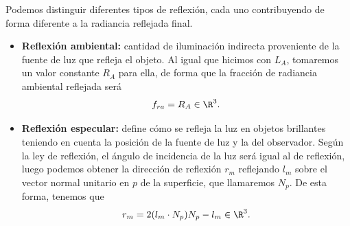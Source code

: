 Podemos distinguir diferentes tipos de reflexión, cada uno contribuyendo de forma diferente a la radiancia reflejada final.

\begin{itemize}
    \item \textbf{Reflexión ambiental:} cantidad de iluminación indirecta proveniente de la fuente de luz que refleja el objeto. Al igual que hicimos con $L_A$, tomaremos un valor constante $R_A$ para ella, de forma que la fracción de radiancia ambiental reflejada será
    \begin{equation*}
        f_{ra} =  R_A \in \R^3.
    \end{equation*}
    \item \textbf{Reflexión especular:} define cómo se refleja la luz en objetos brillantes teniendo en cuenta la posición de la fuente de luz y la del observador. Según la ley de reflexión, el ángulo de incidencia de la luz será igual al de reflexión, luego podemos obtener la dirección de reflexión $r_m$ reflejando $l_m$ sobre el vector normal unitario en $p$ de la superficie, que llamaremos $N_p$. De esta forma, tenemos que
    \begin{equation*}
        r_m = 2(l_m\cdot N_p)N_p - l_m \in \R^3.
    \end{equation*}


\end{itemize}
